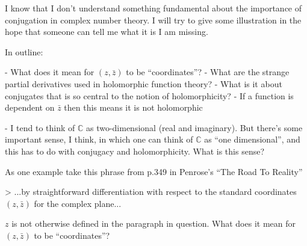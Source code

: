 I know that I don't understand something fundamental about the importance of
conjugation in complex number theory. I will try to give some illustration in
the hope that someone can tell me what it is I am missing.

In outline:

- What does it mean for $(z, \bar z)$ to be ``coordinates''?
- What are the strange partial derivatives used in holomorphic function theory?
- What is it about conjugates that is so central to the notion of holomorphicity?
- If a function is dependent on $\bar z$ then this means it is not holomorphic

- I tend to think of $\mathbb{C}$ as two-dimensional (real and imaginary). But
there's some important sense, I think, in which one can think of $\mathbb{C}$ as
``one dimensional'', and this has to do with conjugacy and holomorphicity. What
is this sense?

As one example take this phrase from p.349 in Penrose's ``The Road To Reality''

> ...by straightforward differentiation with respect to the standard
coordinates $(z, \bar z)$ for the complex plane...

$z$ is not otherwise defined in the paragraph in question. What does it mean
for $(z, \bar z)$ to be ``coordinates''?
